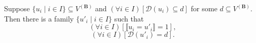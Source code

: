 Suppose $\{u_i \mid i \in I\} \subseteq V^{(\mathbf{B})}$ and $(\forall i \in I)[\mathcal{D}(u_i) \subseteq d]$ for some $d \subseteq V^{(\mathbf{B})}$. Then there is a family $\{u'_i \mid i \in I\}$ such that
$$(\forall i \in I)[\llbracket u_i = u'_i \rrbracket = 1],$$
$$(\forall i \in I)[\mathcal{D}(u'_i) = d].$$
